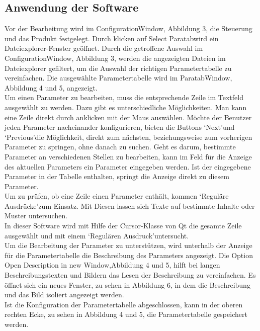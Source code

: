 \subsection{Anwendung der Software}
Vor der Bearbeitung wird im ConfigurationWindow, Abbildung 3, die Steuerung und das Produkt festgelegt. Durch klicken auf \glqq Select Paratab\grqq\space wird ein Dateiexplorer-Fenster geöffnet. Durch die getroffene Auswahl im ConfigurationWindow, Abbildung 3, werden die angezeigten Dateien im Dateiexplorer gefiltert, um die Auswahl der richtigen Parametertabelle zu vereinfachen. Die ausgewählte Parametertabelle wird im ParatabWindow, Abbildung 4 und 5, angezeigt.\\
Um einen Parameter zu bearbeiten, muss die entsprechende Zeile im Textfeld ausgewählt zu werden. Dazu gibt es unterschiedliche Möglichkeiten. Man kann eine Zeile direkt durch anklicken mit der Maus auswählen. Möchte der Benutzer jeden Parameter nacheinander konfigurieren, bieten die Buttons \lq Next\rq\space und \lq Previous\rq\space die Möglichkeit, direkt zum nächsten, beziehungsweise zum vorherigen Parameter zu springen, ohne danach zu suchen. Geht es darum, bestimmte Parameter an verschiedenen Stellen zu bearbeiten, kann im Feld für die Anzeige des aktuellen Parameters ein Parameter eingegeben werden. Ist der eingegebene Parameter in der Tabelle enthalten, springt die Anzeige direkt zu diesem Parameter.\\
Um zu prüfen, ob eine Zeile einen Parameter enthält, kommen \lq Reguläre Ausdrücke\rq\space zum Einsatz. Mit Diesen lassen sich Texte auf bestimmte Inhalte oder Muster untersuchen. \\
In dieser Software wird mit Hilfe der Cursor-Klasse von Qt die gesamte Zeile ausgewählt und mit einem \lq Regulären Ausdruck\rq\space untersucht. \\
Um die Bearbeitung der Parameter zu unterstützen, wird unterhalb der Anzeige für die Parametertabelle die Beschreibung des Parameters angezeigt. Die Option \glqq Open Description in new Window\grqq ,\space Abbildung 4 und 5, hilft bei langen Beschreibungstexten und Bildern das Lesen der Beschreibung zu vereinfachen. Es öffnet sich ein neues Fenster, zu sehen in Abbildung 6, in dem die Beschreibung und das Bild isoliert angezeigt werden.\\
Ist die Konfiguration der Parametertabelle abgeschlossen, kann in der oberen rechten Ecke, zu sehen in Abbildung 4 und 5, die Parametertabelle gespeichert werden. 
